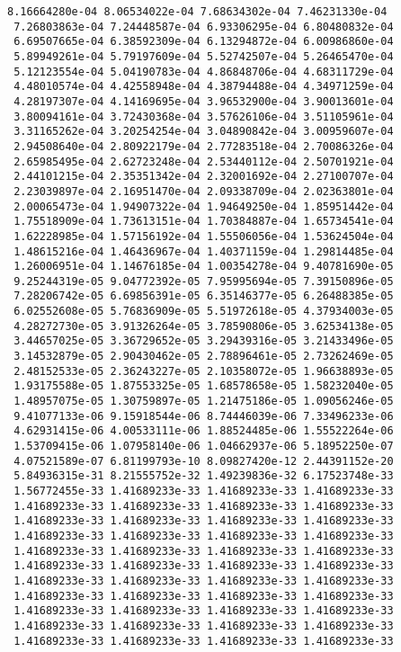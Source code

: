 \documentclass[11pt]{article}
\begin{document}
\begin{Verbatim}[commandchars=\\\{\}]
 8.16664280e-04 8.06534022e-04 7.68634302e-04 7.46231330e-04
 7.26803863e-04 7.24448587e-04 6.93306295e-04 6.80480832e-04
 6.69507665e-04 6.38592309e-04 6.13294872e-04 6.00986860e-04
 5.89949261e-04 5.79197609e-04 5.52742507e-04 5.26465470e-04
 5.12123554e-04 5.04190783e-04 4.86848706e-04 4.68311729e-04
 4.48010574e-04 4.42558948e-04 4.38794488e-04 4.34971259e-04
 4.28197307e-04 4.14169695e-04 3.96532900e-04 3.90013601e-04
 3.80094161e-04 3.72430368e-04 3.57626106e-04 3.51105961e-04
 3.31165262e-04 3.20254254e-04 3.04890842e-04 3.00959607e-04
 2.94508640e-04 2.80922179e-04 2.77283518e-04 2.70086326e-04
 2.65985495e-04 2.62723248e-04 2.53440112e-04 2.50701921e-04
 2.44101215e-04 2.35351342e-04 2.32001692e-04 2.27100707e-04
 2.23039897e-04 2.16951470e-04 2.09338709e-04 2.02363801e-04
 2.00065473e-04 1.94907322e-04 1.94649250e-04 1.85951442e-04
 1.75518909e-04 1.73613151e-04 1.70384887e-04 1.65734541e-04
 1.62228985e-04 1.57156192e-04 1.55506056e-04 1.53624504e-04
 1.48615216e-04 1.46436967e-04 1.40371159e-04 1.29814485e-04
 1.26006951e-04 1.14676185e-04 1.00354278e-04 9.40781690e-05
 9.25244319e-05 9.04772392e-05 7.95995694e-05 7.39150896e-05
 7.28206742e-05 6.69856391e-05 6.35146377e-05 6.26488385e-05
 6.02552608e-05 5.76836909e-05 5.51972618e-05 4.37934003e-05
 4.28272730e-05 3.91326264e-05 3.78590806e-05 3.62534138e-05
 3.44657025e-05 3.36729652e-05 3.29439316e-05 3.21433496e-05
 3.14532879e-05 2.90430462e-05 2.78896461e-05 2.73262469e-05
 2.48152533e-05 2.36243227e-05 2.10358072e-05 1.96638893e-05
 1.93175588e-05 1.87553325e-05 1.68578658e-05 1.58232040e-05
 1.48957075e-05 1.30759897e-05 1.21475186e-05 1.09056246e-05
 9.41077133e-06 9.15918544e-06 8.74446039e-06 7.33496233e-06
 4.62931415e-06 4.00533111e-06 1.88524485e-06 1.55522264e-06
 1.53709415e-06 1.07958140e-06 1.04662937e-06 5.18952250e-07
 4.07521589e-07 6.81199793e-10 8.09827420e-12 2.44391152e-20
 5.84936315e-31 8.21555752e-32 1.49239836e-32 6.17523748e-33
 1.56772455e-33 1.41689233e-33 1.41689233e-33 1.41689233e-33
 1.41689233e-33 1.41689233e-33 1.41689233e-33 1.41689233e-33
 1.41689233e-33 1.41689233e-33 1.41689233e-33 1.41689233e-33
 1.41689233e-33 1.41689233e-33 1.41689233e-33 1.41689233e-33
 1.41689233e-33 1.41689233e-33 1.41689233e-33 1.41689233e-33
 1.41689233e-33 1.41689233e-33 1.41689233e-33 1.41689233e-33
 1.41689233e-33 1.41689233e-33 1.41689233e-33 1.41689233e-33
 1.41689233e-33 1.41689233e-33 1.41689233e-33 1.41689233e-33
 1.41689233e-33 1.41689233e-33 1.41689233e-33 1.41689233e-33
 1.41689233e-33 1.41689233e-33 1.41689233e-33 1.41689233e-33
 1.41689233e-33 1.41689233e-33 1.41689233e-33 1.41689233e-33

\end{Verbatim}
\end{document}
